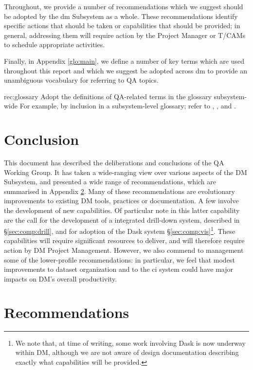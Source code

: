 \documentclass[DM,authoryear,toc]{lsstdoc}
\makeatletter
\newcommand{\printrecs}{%
  \section{Recommendations}%
  \label{sec:recs}
  \begin{enumerate}[leftmargin=7em,label=QAWG-REC-\arabic*:]%
  \def\@noitemerr{\@latex@warning{Empty objective list}}%
  \@starttoc{rec}%
  \end{enumerate}%
}
\makeatother
\begin{document}
Throughout, we provide a number of recommendations which we suggest should be
adopted by the \gls{dm} Subsystem as a whole. These recommendations identify
specific actions that should be taken or capabilities that should be provided;
in general, addressing them will require action by the Project Manager or
T/CAMs to schedule appropriate activities.

Finally, in Appendix \ref{glo:main}, we define a number of key terms which are
used throughout this report and which we suggest be adopted across \gls{dm} to
provide an unambiguous vocabulary for referring to QA topics.

\begin{recommendation}
    {rec:glossary}
    {Adopt the definitions of QA-related terms in the  glossary subsystem-wide}
For example, by inclusion in a subsystem-level glossary; refer to
, , and .
\end{recommendation}





\section{Conclusion}

This document has described the deliberations and conclusions of the QA Working Group.
It has taken a wide-ranging view over various aspects of the DM Subsystem, and presented a wide range of recommendations, which are summarised in Appendix \ref{sec:recs}.
Many of these recommendations are evolutionary improvements to existing DM tools, practices or documentation.
A few involve the development of new capabilities.
Of particular note in this latter capability are the call for the development of a integrated drill-down system, described in \S\ref{sec:comp:drill}, and for adoption of the Dask system \S\ref{sec:comp:vis}\footnote{We note that, at time of writing, some work involving Dask is now underway within DM, although we are not aware of design documentation describing exactly what capabilities will be provided.}.
These capabilities will require significant resources to deliver, and will therefore require action by DM Project Management.
However, we also commend to management some of the lower-profile recommendations: in particular, we feel that modest improvements to dataset organization and to the \gls{ci} system could have major impacts on DM's overall productivity.

\appendix
\printrecs
\glsaddall
\renewcommand*{\glsautoprefix}{glo:}
\printglossary[style=index,numberedsection=autolabel]


\end{document}
